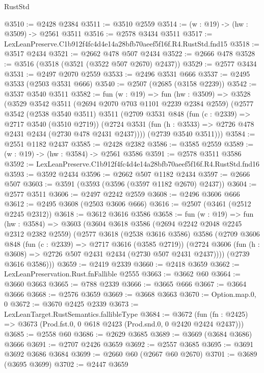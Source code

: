 \begin{lexlean}{RustStd}
\begin{coremodule}
@3510 := @2428 @2384
@3511 := @3510 @2559
@3514 := (w : @19) -> (hw : @3509) -> @2561 @3511
@3516 := @2578 @3434 @3511
@3517 := LexLeanPreserve.C1b912f4fc4d4e14a28bfb70aeef5f16f.R4.RustStd.fnd15
@3518 := @3517 @2434
@3521 := @2662 @478 @507 @2434
@3522 := @2666 @478
@3528 := @3516 (@3518 (@3521 (@3522 @507 @2670) @2437))
@3529 := @2577 @3434
@3531 := @2497 @2070 @2559
@3533 := @2496 @3531 @666
@3537 := @2495 @3533 (@2503 @3531 @666)
@3540 := @2507 (@2685 (@3158 @2239))
@3542 := @3537 @3540 @3511
@3582 := fun (w : @19) =>
  fun (hw : @3509) =>
  @3528
    (@3529
      @3542
      @3511
      (@2694 @2070 @703 @1101 @2239 @2384 @2559)
      (@2577
        @3542
        (@2538 @3540 @3511)
        @3511
        (@2709
          @3531
          @848
          (fun (c : @2339) => @2717 @3540 (@3510 @2719))
          (@2724 @3531 (fun (h : @3533) => @2726 @478 @2431 @2434 (@2730 @478 @2431 @2437))))
        (@2739 @3540 @3511)))
@3584 := @2551 @1182 @2437
@3585 := @2428 @2382
@3586 := @3585 @2559
@3589 := (w : @19) -> (hw : @3584) -> @2561 @3586
@3591 := @2578 @3511 @3586
@3592 := LexLeanPreserve.C1b912f4fc4d4e14a28bfb70aeef5f16f.R4.RustStd.fnd16
@3593 := @3592 @2434
@3596 := @2662 @507 @1182 @2434
@3597 := @2666 @507
@3603 := @3591 (@3593 (@3596 (@3597 @1182 @2670) @2437))
@3604 := @2577 @3511
@3606 := @2497 @2242 @2559
@3608 := @2496 @3606 @666
@3612 := @2495 @3608 (@2503 @3606 @666)
@3616 := @2507 (@3461 (@2512 @2245 @2312))
@3618 := @3612 @3616 @3586
@3658 := fun (w : @19) =>
  fun (hw : @3584) =>
  @3603
    (@3604
      @3618
      @3586
      (@2694 @2242 @2048 @2245 @2312 @2382 @2559)
      (@2577
        @3618
        (@2538 @3616 @3586)
        @3586
        (@2709
          @3606
          @848
          (fun (c : @2339) => @2717 @3616 (@3585 @2719))
          (@2724 @3606 (fun (h : @3608) => @2726 @507 @2431 @2434 (@2730 @507 @2431 @2437))))
        (@2739 @3616 @3586)))
@3659 := @2419 @2339
@3660 := @2418 @3659
@3662 := LexLeanPreservation.Rust.fnFallible @2555
@3663 := @3662 @60
@3664 := @3660 @3663
@3665 := @788 @2339
@3666 := @3665 @666
@3667 := @3664 @3666
@3668 := @2576 @3659
@3669 := @3668 @3663
@3670 := Option.map.{0, 0}
@3672 := @3670 @2425 @2339
@3673 := LexLeanTarget.RustSemantics.fallibleType
@3684 := @3672
    (fun (fn : @2425) => @3673 (Prod.fst.{0, 0} @618 @2423 (Prod.snd.{0, 0} @2420 @2424 @2437)))
@3685 := @2558 @60
@3686 := @2629 @3685
@3689 := @3669 (@3684 @3686) @3666
@3691 := @2707 @2426 @3659
@3692 := @2557 @3685
@3695 := @3691 @3692 @3686 @3684
@3699 := @2660 @60 (@2667 @60 @2670)
@3701 := @3689 (@3695 @3699)
@3702 := @2447 @3659

\end{coremodule}
\end{lexlean}

